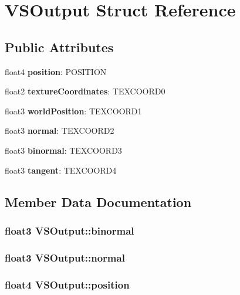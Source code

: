 \section{VSOutput Struct Reference}
\label{struct_v_s_output}
\subsection*{Public Attributes}
\begin{DoxyCompactItemize}
\item 
float4 {\bf position}: POSITION
\item 
float2 {\bf textureCoordinates}: TEXCOORD0
\item 
float3 {\bf worldPosition}: TEXCOORD1
\item 
float3 {\bf normal}: TEXCOORD2
\item 
float3 {\bf binormal}: TEXCOORD3
\item 
float3 {\bf tangent}: TEXCOORD4
\end{DoxyCompactItemize}


\subsection{Member Data Documentation}
\subsubsection[{binormal}]{\setlength{\rightskip}{0pt plus 5cm}float3 {\bf VSOutput::binormal}}\label{struct_v_s_output_a5a39c9271837b0fe535541897d619fde}
\subsubsection[{normal}]{\setlength{\rightskip}{0pt plus 5cm}float3 {\bf VSOutput::normal}}\label{struct_v_s_output_a67a1540c109a358cb23fe13df347873f}
\subsubsection[{position}]{\setlength{\rightskip}{0pt plus 5cm}float4 {\bf VSOutput::position}}\label{struct_v_s_output_a045a78f2b66109778b98e52a787d2797}
